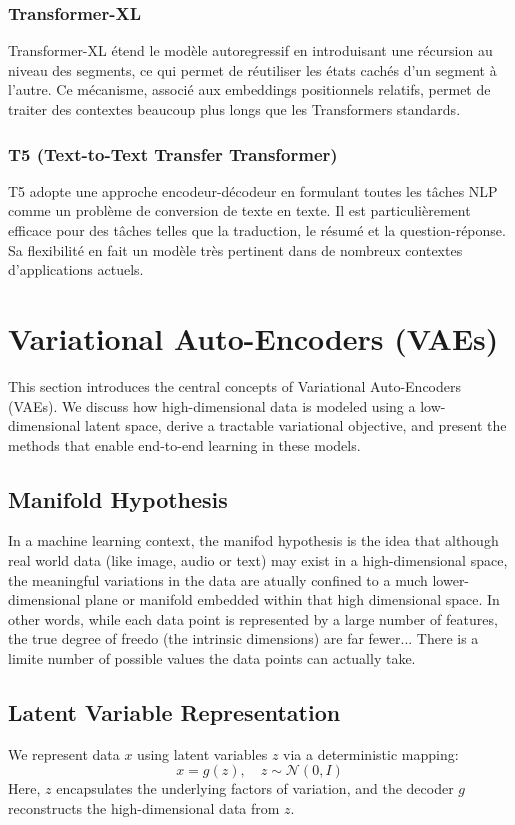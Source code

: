 \documentclass{article}
\begin{document}
\subsubsection{Transformer-XL}
Transformer-XL étend le modèle autoregressif en introduisant une récursion au niveau des segments, ce qui permet de réutiliser les états cachés d’un segment à l’autre. Ce mécanisme, associé aux embeddings positionnels relatifs, permet de traiter des contextes beaucoup plus longs que les Transformers standards.

\subsubsection{T5 (Text-to-Text Transfer Transformer)}
T5 adopte une approche encodeur-décodeur en formulant toutes les tâches NLP comme un problème de conversion de texte en texte. Il est particulièrement efficace pour des tâches telles que la traduction, le résumé et la question-réponse. Sa flexibilité en fait un modèle très pertinent dans de nombreux contextes d'applications actuels.

\clearpage\newpage

\section{Variational Auto-Encoders (VAEs)}
This section introduces the central concepts of Variational Auto-Encoders (VAEs). We discuss how high-dimensional data is modeled using a low-dimensional latent space, derive a tractable variational objective, and present the methods that enable end-to-end learning in these models.

\subsection{Manifold Hypothesis}
In a machine learning context, the manifod hypothesis is the idea that although real world data (like image, audio or text) may exist in a high-dimensional space, the meaningful variations in the data are atually confined to a much lower-dimensional plane or manifold embedded within that high dimensional space. In other words, while each data point is represented by a large number of features, the true degree of freedo (the intrinsic dimensions) are far fewer... There is a limite number of possible values the data points can actually take.

\subsection{Latent Variable Representation}
We represent data \(x\) using latent variables \(z\) via a deterministic mapping:
\[
x = g(z), \quad z \sim \mathcal{N}(0, I)
\]
Here, \(z\) encapsulates the underlying factors of variation, and the decoder \(g\) reconstructs the high-dimensional data from \(z\).
\end{document}
